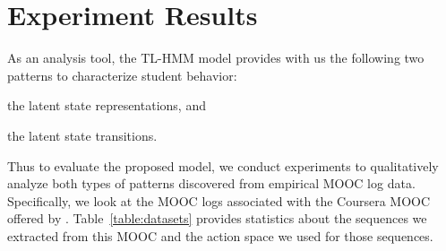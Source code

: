 \section{Experiment Results}

As an analysis tool, the TL-HMM model provides with us the following two
patterns to characterize student behavior:
\begin{enumerate*}[label=(\arabic*)]
  \item the latent state representations, and
  \item the latent state transitions.
\end{enumerate*}
Thus to evaluate the proposed model, we conduct experiments to
qualitatively analyze both types of patterns discovered from empirical MOOC
log data. Specifically, we look at the MOOC logs associated with the
\textretrieval{} Coursera MOOC offered by \UIUC{}.
Table~\ref{table:datasets} provides statistics about the sequences we
extracted from this MOOC and the action space we used for those sequences.

